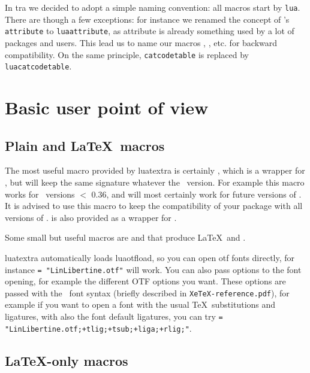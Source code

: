 \documentclass{article}
\makeatletter
\newlength\xxt@kern@Te
\newlength\xxt@kern@eX
\newlength\xxt@lower@e
\DeclareRobustCommand\XeTeX{%
  \leavevmode
  \smash{%
   X\lower\xxt@lower@e
   \hbox{\kern\xxt@kern@eX
   \setbox0=\hbox{E}\dimen0=\ht0\advance\dimen0by\dp0%
   \raise\dimen0\hbox{\rotatebox{180}{\box0}}%
   }\kern\xxt@kern@Te\TeX}}%
\makeatother
\begin{document}
In \LuaTeX tra we decided to adopt a simple naming convention: all macros
start by \texttt{lua}. There are though a few exceptions: for instance we
renamed the concept of \LuaTeX 's \texttt{attribute} to \texttt{luaattribute},
as attribute is already something used by a lot of packages and users. This
lead us to name our macros \texttt{\string\newluaattribute},
\texttt{\string\unsetluaattribute}, etc. for backward compatibility. On the
same principle, \texttt{catcodetable} is replaced by \texttt{luacatcodetable}.

\section{Basic user point of view}

\subsection{Plain and \LaTeX\ macros}

The most useful macro provided by \textsf{luatextra} is certainly
\texttt{\string\luadirect}, which is a wrapper for \texttt{\string\directlua},
but will keep the same signature whatever the \LuaTeX\ version. For example
this macro works for \LuaTeX\ versions $<$ 0.36, and will most certainly work
for future versions of \LuaTeX . It is advised to use this macro to keep the
compatibility of your package with all versions of \LuaTeX .
\texttt{\string\lualate} is also provided as a wrapper for
\texttt{\string\latelua}.

Some small but useful macros are \texttt{\string\LuaTeX} and
\texttt{\string\LuaLaTeX} that produce \LaTeX\ and \LuaLaTeX .

\textsf{luatextra} automatically loads \textsf{luaotfload}, so you can open
otf fonts directly, for instance \texttt{\string\font\string\foo =
  "LinLibertine.otf"\string\foo} will work. You can also pass options to the
font opening, for example the different OTF options you want. These options
are passed with the \XeTeX\ font syntax (briefly described in
\texttt{XeTeX-reference.pdf}), for example if you want to open a font with the
usual \TeX\ substitutions and ligatures, with also the font default ligatures,
you can try \newline \texttt{\string\font\string\foo =
  "LinLibertine.otf;+tlig;+tsub;+liga;+rlig;"\string\foo}.

\subsection{\LaTeX -only macros}
\end{document}
